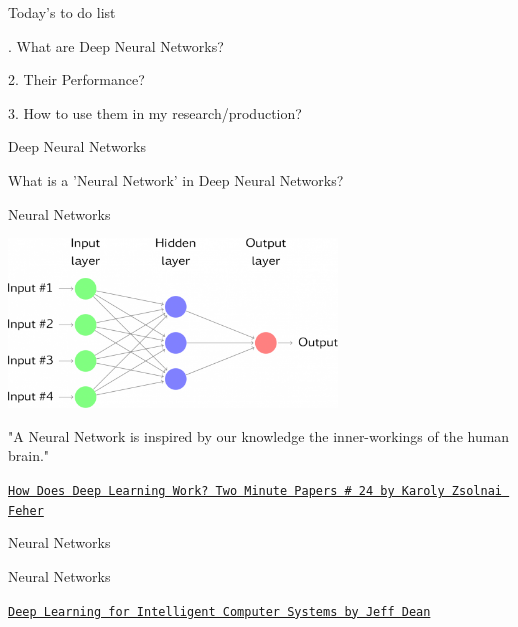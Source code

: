 \documentclass[12pt,t]{beamer}
\begin{document}
\begin{frame}[c]{Today's to do list}

. What are Deep Neural Networks?
\pause

2. Their Performance?
\pause

3. How to use them in my research/production?


\end{frame}

\begin{frame}[c]{Deep Neural Networks}

What is a 'Neural Network' in Deep Neural Networks?

\end{frame}

\begin{frame}[c]{Neural Networks}

\includegraphics[height=45mm]{Figs/neuralnet.png}

"A Neural Network is inspired by our knowledge the inner-workings of the human brain."


\hfill
{\footnotesize \lolit
\href{https://www.youtube.com/watch?v=He4t7Zekob0}{\tt How Does Deep Learning Work? Two Minute Papers \# 24 by Karoly Zsolnai Feher}
}

\end{frame}

\begin{frame}[c]{Neural Networks}

\end{frame}

\begin{frame}[c]{Neural Networks}

{\footnotesize \lolit
\href{https://www.youtube.com/watch?v=QSaZGT4-6EY}{\tt  Deep Learning for Intelligent Computer Systems by Jeff Dean}
}

\end{frame}
\end{document}

